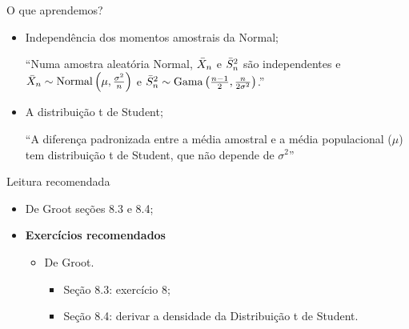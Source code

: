 \begin{frame}{O que aprendemos?}
\begin{itemize}

  \item[\faLightbulbO] Independência dos momentos amostrais da Normal;    
  
   ``Numa amostra aleatória Normal, $\bar{X}_n$ e $\bar{S}^2_n$ são independentes e $\bar{X}_n \sim \operatorname{Normal}\left(\mu, \frac{\sigma^2}{n}\right)$ e $\bar{S}^2_n \sim \operatorname{Gama}\left(\frac{n-1}{2},  \frac{n}{2\sigma^2}\right)$.''  
     
   \item[\faLightbulbO] A distribuição t de Student;
   
   ``A diferença padronizada entre a média amostral e a média populacional ($\mu$) tem distribuição t de Student, que não depende de $\sigma^2$''
    
  \end{itemize}
 \end{frame}

\begin{frame}{Leitura recomendada}
\begin{itemize}
 \item[\faBook] De Groot seções 8.3 e 8.4;
 \item {\large\textbf{Exercícios recomendados}}
 \begin{itemize}
  \item[\faBookmark] De Groot.
  \begin{itemize}
   \item Seção 8.3: exercício 8;
   \item Seção 8.4: derivar a densidade da Distribuição t de Student.
  \end{itemize}   
  \end{itemize}
 \end{itemize} 
\end{frame}
